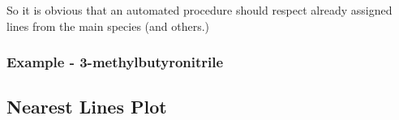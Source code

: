 \documentclass[11pt]{article}
\begin{document}
So it is obvious that an automated procedure should respect already assigned lines from the main species (and others.)








\subsubsection{Example - 3-methylbutyronitrile}


\subsection{Nearest Lines Plot}
\end{document}
